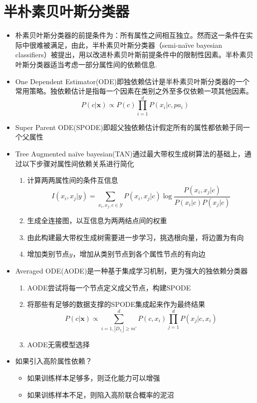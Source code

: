 \section{半朴素贝叶斯分类器}

\begin{itemize}
\item 朴素贝叶斯分类器的前提条件为：所有属性之间相互独立。然而这一条件在实际中很难被满足，由此，半朴素贝叶斯分类器（semi-na\"ive bayesian classifiers）被提出，用以改进朴素贝叶斯前提条件中的限制性因素。半朴素贝叶斯分类器适当考虑一部分属性间的依赖信息.
\item One Dependent Estimator(ODE)即独依赖估计是半朴素贝叶斯分类器的一个常用策略。独依赖估计是指每一个因素在类别之外至多仅依赖一项其他因素。
\begin{equation}
P(c|\bm{x})\propto P(c)\prod_{i=1}^dP(x_i|c,pa_i)
\end{equation}
\item Super Parent ODE(SPODE)即超父独依赖估计假定所有的属性都依赖于同一个父属性
\item Tree Augmented na\"ive bayesian(TAN)通过最大带权生成树算法的基础上，通过以下步骤对属性间依赖关系进行简化
    \begin{enumerate}
    \item 计算两两属性间的条件互信息
    \begin{equation}I(x_i,x_j|y)=\sum_{x_i,x_j,c\in\mathcal{Y}}P(x_i,x_j|c)\log\frac{P(x_i,x_j|c)}{P(x_i|c)P(x_j|c)}
    \end{equation}
    \item 生成全连接图，以互信息为两两结点间的权重
    \item 由此构建最大带权生成树需要进一步学习，挑选根向量，将边置为有向
    \item 增加类别节点$y$，增加从类别节点到各个属性节点的有向边
\end{enumerate}
\item Averaged ODE(AODE)是一种基于集成学习机制，更为强大的独依赖分类器
    \begin{enumerate}
    \item AODE尝试将每一个节点定义成父节点，构建SPODE
    \item 将那些有足够的数据支撑的SPODE集成起来作为最终结果
    \begin{equation}
    P(c|\bm{x})\propto \sum_{i=1, |D_{x_i}|\ge m'}^dP(c,x_i)\prod_{j=1}^dP(x_j|c,x_i)
    \end{equation}
    \item AODE无需模型选择
    \end{enumerate}
\item 如果引入高阶属性依赖？
    \begin{itemize}
    \item 如果训练样本足够多，则泛化能力可以增强
    \item 如果训练样本不足，则陷入高阶联合概率的泥沼
    \end{itemize}
\end{itemize}

